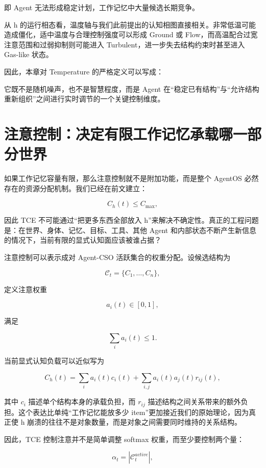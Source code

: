 即 Agent 无法形成稳定计划，工作记忆中大量候选长期竞争。

从 h 的运行相态看，温度轴与我们此前提出的认知相图直接相关。非常低温可能造成僵化，适中温度与合理控制强度可以形成 Ground 或 Flow，而高温配合过宽注意范围和过弱抑制则可能进入 Turbulent，进一步失去结构约束时甚至进入 Gas-like 状态。

因此，本章对 Temperature 的严格定义可以写成：

\begin{statementbox}
\centering
{}
\end{statementbox}

它既不是随机噪声，也不是智慧程度，而是 Agent 在“稳定已有结构”与“允许结构重新组织”之间进行实时调节的一个关键控制维度。

\section{注意控制：决定有限工作记忆承载哪一部分世界}

如果工作记忆容量有限，那么注意控制就不是附加功能，而是整个 AgentOS 必然存在的资源分配机制。我们已经在前文建立：

\[
C_h(t)\le C_{\max},
\]

因此 TCE 不可能通过“把更多东西全部放入 h”来解决不确定性。真正的工程问题是：在世界、身体、记忆、目标、工具、其他 Agent 和内部状态不断产生新信息的情况下，当前有限的显式认知面应该被谁占据？

注意控制可以表示成对 Agent-CSO 活跃集合的权重分配。设候选结构为

\[
\mathcal C_t
=
\{C_1,\ldots,C_n\},
\]

定义注意权重

\[
a_i(t)\in[0,1],
\]

满足

\[
\sum_i a_i(t)\le 1.
\]

当前显式认知负载可以近似写为

\[
C_h(t)
=
\sum_i
a_i(t)c_i(t)
+
\sum_{i,j}
a_i(t)a_j(t)r_{ij}(t),
\]

其中 $c_i$ 描述单个结构本身的承载负担，而 $r_{ij}$ 描述结构之间关系带来的额外负担。这个表达比单纯“工作记忆能放多少 item”更加接近我们的原始理论，因为真正使 h 崩溃的往往不是对象数量，而是对象之间需要同时维持的关系结构。

因此，TCE 控制注意并不是简单调整 softmax 权重，而至少要控制两个量：

\[
\alpha_t
=
|\mathcal C_t^{active}|,
\]

